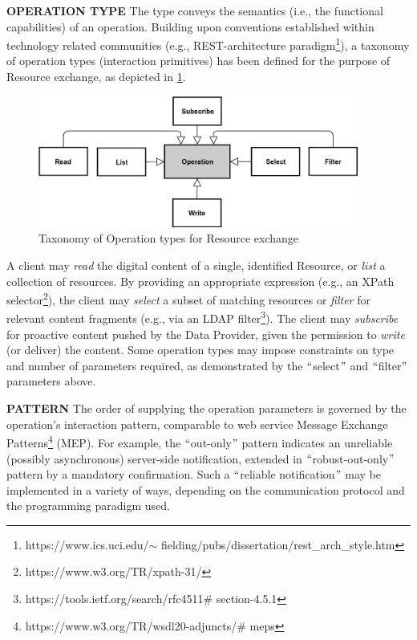 \textbf{OPERATION TYPE} The type conveys the semantics (i.e., the functional capabilities) of an operation. Building upon conventions established within technology related communities (e.g., REST-architecture paradigm\footnote{https://www.ics.uci.edu/$ \sim $ fielding/pubs/dissertation/rest\_arch\_style.htm }), a taxonomy of operation types (interaction primitives) has been defined for the purpose of Resource exchange, as depicted in \ref{fig:Taxonomy_of_Operation_types_for_Resource_exchange}. 




\begin{figure}[H]
	\begin{Center}
		\includegraphics[width=4.15in,height=1.7in]{./media/image40.png}
		\caption{Taxonomy of Operation types for Resource exchange}
		\label{fig:Taxonomy_of_Operation_types_for_Resource_exchange}
	\end{Center}
\end{figure}





A client may\textit{ read} the digital content of a single, identified Resource, or \textit{list} a collection of resources. By providing an appropriate expression (e.g., an XPath selector\footnote{https://www.w3.org/TR/xpath-31/ }), the client may \textit{select } a subset of matching resources or \textit{filter } for relevant content fragments (e.g., via an LDAP filter\footnote{https://tools.ietf.org/search/rfc4511$\#$ section-4.5.1 }). The client may \textit{subscribe} for proactive content pushed by the Data Provider, given the permission to \textit{write} (or deliver) the content. Some operation types may impose constraints on type and number of parameters required, as demonstrated by the $``$select$"$  and $``$filter$"$  parameters above.

\textbf{PATTERN }The order of supplying the operation parameters is governed by the operation’s interaction pattern, comparable to web service Message Exchange Patterns\footnote{https://www.w3.org/TR/wsdl20-adjuncts/$\#$ meps } (MEP). For example, the $``$out-only$"$  pattern indicates an unreliable (possibly asynchronous) server-side notification, extended in $``$robust-out-only$"$  pattern by a mandatory confirmation. Such a $``$reliable notification$"$  may be implemented in a variety of ways, depending on the communication protocol and the programming paradigm used.

